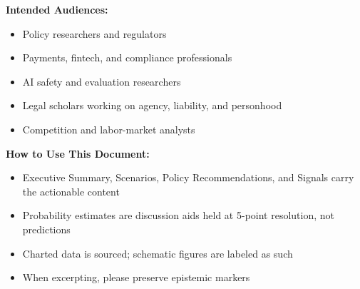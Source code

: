 \documentclass[11pt,letterpaper]{article}
\begin{document}
\begin{minipage}[t]{0.48\textwidth}
\textbf{Intended Audiences:}
\begin{itemize}[nosep]
  \item Policy researchers and regulators
  \item Payments, fintech, and compliance professionals
  \item AI safety and evaluation researchers
  \item Legal scholars working on agency, liability, and personhood
  \item Competition and labor-market analysts
\end{itemize}
\end{minipage}
\hfill
\begin{minipage}[t]{0.48\textwidth}
\textbf{How to Use This Document:}
\begin{itemize}[nosep]
  \item Executive Summary, Scenarios, Policy Recommendations, and Signals carry the actionable content
  \item Probability estimates are discussion aids held at 5-point resolution, not predictions
  \item Charted data is sourced; schematic figures are labeled as such
  \item When excerpting, please preserve epistemic markers
\end{itemize}
\end{minipage}

\vspace{0.4cm}
\end{document}
